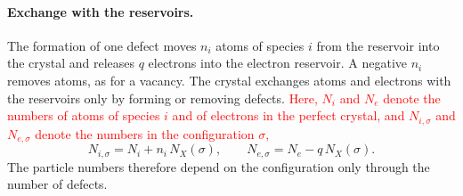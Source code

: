 \documentclass[11pt]{article}      %
\numberwithin{equation}{section}   %
\begin{document}
\paragraph{Exchange with the reservoirs.}
The formation of one defect moves $n_i$ atoms of species $i$ from the
reservoir into the crystal and releases $q$ electrons into the electron
reservoir. A negative $n_i$ removes atoms, as for a vacancy. The crystal
exchanges atoms and electrons with the reservoirs only by forming or
removing defects. \textcolor{red}{Here, $N_i$ and $N_e$ denote the numbers
of atoms of species $i$ and of electrons in the perfect crystal, and
$N_{i,\sigma}$ and $N_{e,\sigma}$ denote the numbers in the configuration
$\sigma$,}
\begin{equation}
    \boxed{N_{i,\sigma}=N_i+n_i\,N_X(\sigma),\qquad
    N_{e,\sigma}=N_e-q\,N_X(\sigma).}
    \label{eq:numbers}
\end{equation}
The particle numbers therefore depend on the configuration only through the
number of defects.
\end{document}
